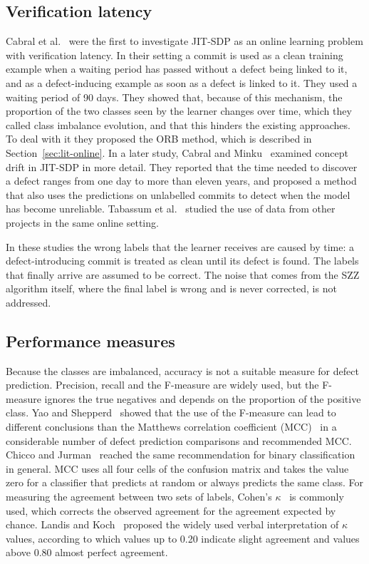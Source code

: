 \documentclass[12pt,a4paper,oneside]{report}
\begin{document}
\subsection{Verification latency}

Cabral et al.~\cite{cabral2019orb} were the first to investigate JIT-SDP as an
online learning problem with verification latency. In their setting a commit
is used as a clean training example when a waiting period has passed without
a defect being linked to it, and as a defect-inducing example as soon as a
defect is linked to it. They used a waiting period of 90 days. They showed
that, because of this mechanism, the proportion of the two classes seen by
the learner changes over time, which they called class imbalance evolution,
and that this hinders the existing approaches. To deal with it they proposed
the ORB method, which is described in Section~\ref{sec:lit-online}. In a later
study, Cabral and Minku~\cite{cabral2023reliable} examined concept drift in
JIT-SDP in more detail. They reported that the time needed to discover a
defect ranges from one day to more than eleven years, and proposed a method
that also uses the predictions on unlabelled commits to detect when the model
has become unreliable. Tabassum et al.~\cite{tabassum2020cross} studied the
use of data from other projects in the same online setting.

In these studies the wrong labels that the learner receives are caused by
time: a defect-introducing commit is treated as clean until its defect is
found. The labels that finally arrive are assumed to be correct. The noise
that comes from the SZZ algorithm itself, where the final label is wrong and
is never corrected, is not addressed.

\subsection{Performance measures}

Because the classes are imbalanced, accuracy is not a suitable measure for
defect prediction. Precision, recall and the F-measure are widely used, but
the F-measure ignores the true negatives and depends on the proportion of the
positive class. Yao and Shepperd~\cite{yao2020mcc} showed that the use of the
F-measure can lead to different conclusions than the Matthews correlation
coefficient (MCC)~\cite{matthews1975mcc} in a considerable number of defect
prediction comparisons and recommended MCC. Chicco and
Jurman~\cite{chicco2020mcc} reached the same recommendation for binary
classification in general. MCC uses all four cells of the confusion matrix
and takes the value zero for a classifier that predicts at random or always
predicts the same class. For measuring the agreement between two sets of
labels, Cohen's $\kappa$~\cite{cohen1960kappa} is commonly used, which
corrects the observed agreement for the agreement expected by chance. Landis
and Koch~\cite{landis1977kappa} proposed the widely used verbal
interpretation of $\kappa$ values, according to which values up to 0.20
indicate slight agreement and values above 0.80 almost perfect agreement.
\end{document}
